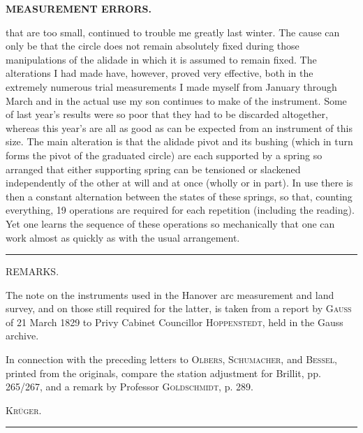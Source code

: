 \par\clearpage
\noindent\null\hfill{\small\textbf{MEASUREMENT ERRORS.}}\hfill{}\par\medskip
\noindent that are too small, continued to trouble me greatly last winter. The cause can only be that the circle does not remain absolutely fixed during those manipulations of the alidade in which it is assumed to remain fixed. The alterations I had made have, however, proved very effective, both in the extremely numerous trial measurements I made myself from January through March and in the actual use my son continues to make of the instrument. Some of last year's results were so poor that they had to be discarded altogether, whereas this year's are all as good as can be expected from an instrument of this size. The main alteration is that the alidade pivot and its bushing (which in turn forms the pivot of the graduated circle) are each supported by a spring so arranged that either supporting spring can be tensioned or slackened independently of the other at will and at once (wholly or in part). In use there is then a constant  alternation between the states of these springs, so that, counting everything, 19 operations are required for each repetition (including the reading). Yet one learns the sequence of these operations so mechanically that one can work almost as quickly as with the usual arrangement.
\par\bigskip
\begin{center}\rule{2.6cm}{.4pt}\end{center}
\vspace{1.2cm}
{\small
\begin{center}REMARKS.\end{center}
\par\noindent\hspace*{\parindent}The note on the instruments used in the Hanover arc measurement and land survey, and on those still required for the latter, is taken from a report by \textsc{Gauss} of 21 March 1829 to Privy Cabinet Councillor \textsc{Hoppenstedt}, held in the Gauss archive.
\par\noindent\hspace*{\parindent}In connection with the preceding letters to \textsc{Olbers}, \textsc{Schumacher}, and \textsc{Bessel}, printed from the originals, compare the station adjustment for Brillit, pp. 265/267, and a remark by Professor \textsc{Goldschmidt}, p. 289.
\par\noindent\hfill\textsc{Krüger.}\hspace*{1em}\par}
\vspace{1cm}
\begin{center}\rule{3.5cm}{.4pt}\end{center}
\par\medskip\noindent\makebox[.86\linewidth][r]{63\textsuperscript{*}}\par

